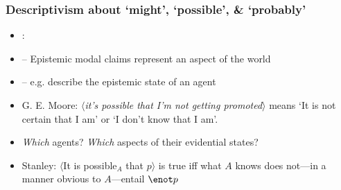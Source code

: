 \begin{frame}
\frametitle{Descriptivism about `might', `possible', \& `probably'}

\begin{itemize}[<+->]

\item {}:

\item[] -- Epistemic modal claims represent an aspect of the world

\item[] -- e.g. describe the epistemic state of an agent

\item G. E. Moore: $\langle$\textit{it's possible that I'm not getting promoted}$\rangle$ means `It is not certain that I am' or `I don't know that I am'. 


\item \textit{Which} agents? \textit{Which} aspects of their evidential states?

\item Stanley: $\langle$It is possible$_A$ that $p$$\rangle$ is true iff what $A$ knows does not---in a manner obvious to $A$---entail $\enot p$


\end{itemize}
\end{frame}

